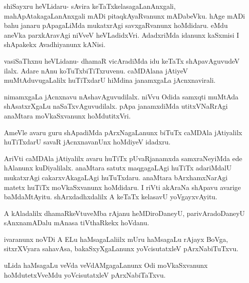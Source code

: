 \documentclass{article}
\begin{document}
\begin{mng}%
shiSayxru heVLidaru- sAvira keTaTxkelasagaLanAnxgali, 
mahApAtakagaLanAnxgali mADi pitaqkAyaRvanunx mADabeVku. hAge mADi bahu
janaru pApagaLiMda mukatxrAgi savxgaRvanunx hoMdidaru. eMdu aneVka parxkAravAgi
niVveV heVLadidxVri. AdadxriMda idanunx kaSxmisi I shApakekx Avadhiyanunx 
kANisi.
\end{mng}

\begin{mng}%
vasiSaThxnu heVLidanu- dhamaR vicAradiMda idu keTaTx shApavAguvudeV
ilalx. Adare nAnu koTuTxbiTiTxruvenu. caMDAlana jAtiyeV
muMtAduvugaLalilx huTiTxdarU hiMdina janamxgaLa jAcnxnavirali.
\end{mng}

\begin{mng}%
nimamxgaLa jAcnxnavu nAshavAguvudilalx. niVvu Odida samxqti
muMtAda shAsatxrXgaLu naSaTxvAguvudilalx. pApa janamxdiMda utitxVNaRrAgi
anaMtara moVkaSxvanunx hoMdutitxVri.
\end{mng}

\begin{mng}%
AmeVle avaru guru shApadiMda pArxNagaLanunx biTuTx caMDAla
jAtiyalilx huTiTxdarU savaR jAcnxnavanUnx hoMdiyeV idadxru.
\end{mng}

\begin{mng}%
AriVti caMDAla jAtiyalilx avaru huTiTx pUvaRjanamxda
samxraNeyiMda ede hAlanunx kuDiyalilalx. anaMtara satutx maqgagaLAgi huTiTx
adariMdalU mukatxrAgi cakarxvAkagaLAgi huTuTxdaru. anaMtara bArxhamxNarAgi
matetx huTiTx moVkaSxvanunx hoMdidaru. I riVti akAraNa shApavu avarige
baMdaMtAyitu. shArxdadhxdalilx A keTaTx kelasavU yoVgayxvAyitu.
\end{mng}

\begin{mng}%
A kAladalilx dhamaRkeVtuveMba rAjanu heMDiroDaneyU, parivAradoDaneyU
sAnxnamADalu mAnasa tiVthaRkekx hoVdanu.
\end{mng}

\begin{mng}%
ivaranunx noVDi A ELu haMsagaLaliilx mUru haMsagaLu rAjayx
BoVga, sitxrXVyara sahavAsa, bakaSxyXgaLanunx yoVcisutatxleV pArxNabiTuTxvu.
\end{mng}

\begin{mng}%
uLida haMsagaLu veVda veVdAMgagaLanunx Odi moVkaSxvanunx
hoMdutetxVveMdu yoVcisutatxleV pArxNabiTaTxvu.
\end{mng}
\end{document}
